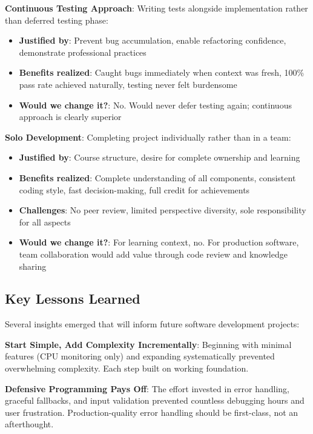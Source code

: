 \documentclass[12pt,a4paper,oneside]{report}
\begin{document}
\textbf{Continuous Testing Approach}: Writing tests alongside implementation rather than deferred testing phase:

\begin{itemize}
    \item \textbf{Justified by}: Prevent bug accumulation, enable refactoring confidence, demonstrate professional practices
    \item \textbf{Benefits realized}: Caught bugs immediately when context was fresh, 100\% pass rate achieved naturally, testing never felt burdensome
    \item \textbf{Would we change it?}: No. Would never defer testing again; continuous approach is clearly superior
\end{itemize}

\textbf{Solo Development}: Completing project individually rather than in a team:

\begin{itemize}
    \item \textbf{Justified by}: Course structure, desire for complete ownership and learning
    \item \textbf{Benefits realized}: Complete understanding of all components, consistent coding style, fast decision-making, full credit for achievements
    \item \textbf{Challenges}: No peer review, limited perspective diversity, sole responsibility for all aspects
    \item \textbf{Would we change it?}: For learning context, no. For production software, team collaboration would add value through code review and knowledge sharing
\end{itemize}

\subsection{Key Lessons Learned}

Several insights emerged that will inform future software development projects:

\textbf{Start Simple, Add Complexity Incrementally}: Beginning with minimal features (CPU monitoring only) and expanding systematically prevented overwhelming complexity. Each step built on working foundation.

\textbf{Defensive Programming Pays Off}: The effort invested in error handling, graceful fallbacks, and input validation prevented countless debugging hours and user frustration. Production-quality error handling should be first-class, not an afterthought.
\end{document}
